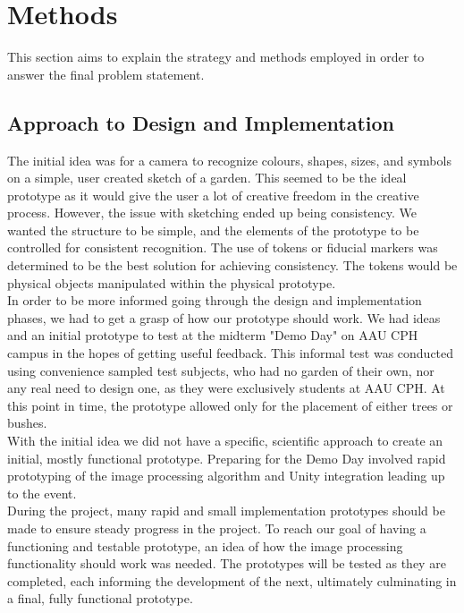 \chapter{Methods}
This section aims to explain the strategy and methods employed in order to answer the final problem statement. 

\section{Approach to Design and Implementation}

The initial idea was for a camera to recognize colours, shapes, sizes, and symbols on a simple, user created sketch of a garden. This seemed to be the ideal prototype as it would give the user a lot of creative freedom in the creative process. However, the issue with sketching ended up being consistency. We wanted the structure to be simple, and the elements of the prototype to be controlled for consistent recognition. The use of tokens or fiducial markers was determined to be the best solution for achieving consistency. The tokens would be physical objects manipulated within the physical prototype.\\

In order to be more informed going through the design and implementation phases, we had to get a grasp of how our prototype should work. We had ideas and an initial prototype to test at the midterm "Demo Day" on AAU CPH campus in the hopes of getting useful feedback. This informal test was conducted using convenience sampled test subjects, who had no garden of their own, nor any real need to design one, as they were exclusively students at AAU CPH. At this point in time, the prototype allowed only for the placement of either trees or bushes.\\

With the initial idea we did not have a specific, scientific approach to create an initial, mostly functional prototype. Preparing for the Demo Day involved rapid prototyping of the image processing algorithm and Unity integration leading up to the event.\\

During the project, many rapid and small implementation prototypes should be made to ensure steady progress in the project.
To reach our goal of having a functioning and testable prototype, an idea of how the image processing functionality should work was needed. The prototypes will be tested as they are completed, each informing the development of the next, ultimately culminating in a final, fully functional prototype.\\

